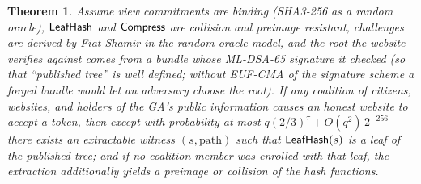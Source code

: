\documentclass[11pt]{article}
\newtheorem{theorem}{Theorem}
\theoremstyle{definition}
\begin{document}
\begin{theorem}
\label{thm:unforge}
Assume view commitments are binding (SHA3-256 as a random oracle), $\mathsf{LeafHash}$ and
$\mathsf{Compress}$ are collision and preimage resistant, challenges are derived by Fiat-Shamir in
the random oracle model, and the root the website verifies against comes from a bundle
whose ML-DSA-65 signature it checked (so that ``published tree'' is well defined; without
EUF-CMA of the signature scheme a forged bundle would let an adversary choose the root). If any coalition of citizens, websites, and
holders of the GA's public information causes an honest website to accept a token, then
except with probability at most $q(2/3)^\tau + O(q^2)\,2^{-256}$ there exists an
extractable witness $(s, \mathrm{path})$ such that $\mathsf{LeafHash}(s)$ is a leaf of the
published tree; and if no coalition member was enrolled with that leaf, the extraction
additionally yields a preimage or collision of the hash functions.
\end{theorem}
\end{document}
